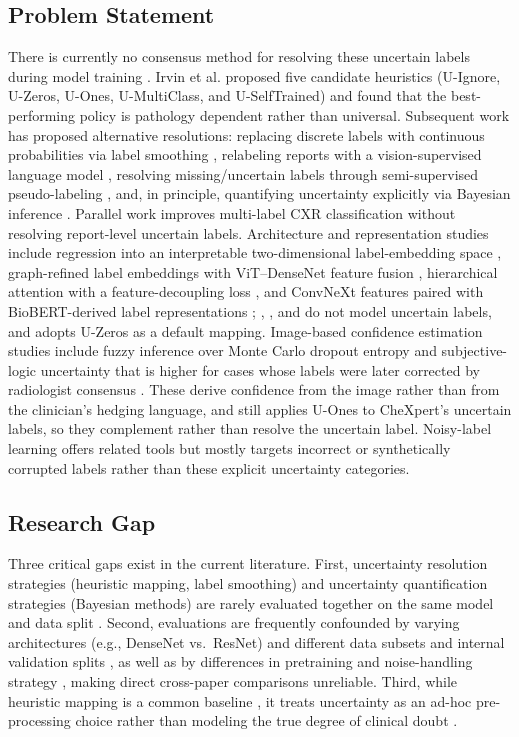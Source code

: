 \documentclass[conference]{IEEEtran}
\begin{document}
\subsection{Problem Statement}
There is currently no consensus method for resolving these uncertain labels during model training \cite{ref1,ref5,ref6,ref7,ref8,ref10,ref11,ref15}. Irvin et al. \cite{ref1} proposed five candidate heuristics (U-Ignore, U-Zeros, U-Ones, U-MultiClass, and U-SelfTrained) and found that the best-performing policy is pathology dependent rather than universal. Subsequent work has proposed alternative resolutions: replacing discrete labels with continuous probabilities via label smoothing \cite{ref5}, relabeling reports with a vision-supervised language model \cite{ref6}, resolving missing/uncertain labels through semi-supervised pseudo-labeling \cite{ref7}, and, in principle, quantifying uncertainty explicitly via Bayesian inference \cite{ref8,ref11}. Parallel work improves multi-label CXR classification without resolving report-level uncertain labels. Architecture and representation studies include regression into an interpretable two-dimensional label-embedding space \cite{ref9}, graph-refined label embeddings with ViT--DenseNet feature fusion \cite{ref10}, hierarchical attention with a feature-decoupling loss \cite{ref13}, and ConvNeXt features paired with BioBERT-derived label representations \cite{ref16}; \cite{ref9}, \cite{ref13}, and \cite{ref16} do not model uncertain labels, and \cite{ref10} adopts U-Zeros as a default mapping. Image-based confidence estimation studies include fuzzy inference over Monte Carlo dropout entropy \cite{ref11} and subjective-logic uncertainty that is higher for cases whose labels were later corrected by radiologist consensus \cite{ref12}. These derive confidence from the image rather than from the clinician's hedging language, and \cite{ref11} still applies U-Ones to CheXpert's uncertain labels, so they complement rather than resolve the uncertain label. Noisy-label learning \cite{ref14,ref15,ref17} offers related tools but mostly targets incorrect or synthetically corrupted labels rather than these explicit uncertainty categories.

\subsection{Research Gap}
Three critical gaps exist in the current literature. First, uncertainty resolution strategies (heuristic mapping, label smoothing) and uncertainty quantification strategies (Bayesian methods) are rarely evaluated together on the same model and data split \cite{ref5,ref8,ref11,ref12,ref15}. Second, evaluations are frequently confounded by varying architectures (e.g., DenseNet vs.\ ResNet) \cite{ref9,ref10,ref12,ref13,ref16} and different data subsets and internal validation splits \cite{ref7,ref9,ref10,ref11,ref12,ref13}, as well as by differences in pretraining and noise-handling strategy \cite{ref14,ref15}, making direct cross-paper comparisons unreliable. Third, while heuristic mapping is a common baseline \cite{ref1,ref10,ref11}, it treats uncertainty as an ad-hoc pre-processing choice rather than modeling the true degree of clinical doubt \cite{ref5,ref7,ref8,ref11,ref12}.
\end{document}
